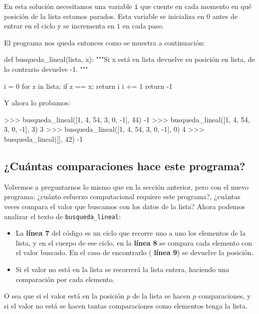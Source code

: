 En esta solución necesitamos una variable \lstinline!i! que cuente en cada
momento en qué posición de la lista estamos parados. Esta variable se
inicializa en $0$ antes de entrar en el ciclo y se incrementa en $1$ en
cada paso.

El programa nos queda entonces como se muestra a continuación:

\begin{codigo-python}
def busqueda_lineal(lista, x):
    """Si x está en lista devuelve su posición en lista, de lo
    contrario devuelve -1.
    """

    i = 0
    for z in lista:
        if z == x:
            return i
        i += 1
    return -1
\end{codigo-python}

Y ahora lo probamos:

\begin{codigo-python-sn}
>>> busqueda_lineal([1, 4, 54, 3, 0, -1], 44)
-1
>>> busqueda_lineal([1, 4, 54, 3, 0, -1], 3)
3
>>> busqueda_lineal([1, 4, 54, 3, 0, -1], 0)
4
>>> busqueda_lineal([], 42)
-1
\end{codigo-python-sn}

\subsection*{¿Cuántas comparaciones hace este programa?}

Volvemos a preguntarnos lo mismo que en la sección anterior, pero con el nuevo
programa: ¿cuánto esfuerzo computacional requiere este programa?, ¿cuántas
veces compara el valor que buscamos con los datos de la lista? Ahora podemos
analizar el texto de \lstinline!busqueda_lineal!:

\begin{itemize}
\item La {\bf línea 7} del código es un ciclo que recorre uno a uno los
elementos de la lista, y en el cuerpo de ese ciclo, en la {\bf línea 8} se
compara cada elemento con el valor buscado. En el caso de encontrarlo ({\bf
línea 9}) se devuelve la posición.

\item Si el valor no está en la lista se recorrerá la lista entera, haciendo
una comparación por cada elemento.
\end{itemize}

O sea que si el valor está en la posición $p$ de la lista se hacen $p$
comparaciones, y si el valor no está se hacen tantas comparaciones como
elementos tenga la lista.


